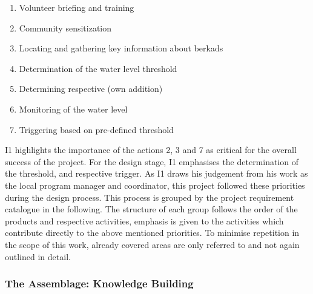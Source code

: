 \begin{enumerate}
    \item Volunteer briefing and training
    \item Community sensitization
    \item Locating and gathering key information about berkads
    \item Determination of the water level threshold 
    \item Determining respective  (own addition)
    \item Monitoring of the water level
    \item Triggering  based on pre-defined threshold    
\end{enumerate}

I1 highlights the importance of the actions 2, 3 and 7 as critical for the overall success of the project. For the design stage, I1 emphasises the determination of the threshold,  and respective trigger. As I1 draws his judgement from his work as the local program manager and coordinator, this project followed these priorities during the design process. This process is grouped by the project requirement catalogue in the following. The structure of each group follows the order of the products and respective activities, emphasis is given to the activities which contribute directly to the above mentioned priorities. To minimise repetition in the scope of this work, already covered areas are only referred to and not again outlined in detail. 

\subsubsection{The Assemblage: Knowledge Building}\label{subsubsec:assemblage}

